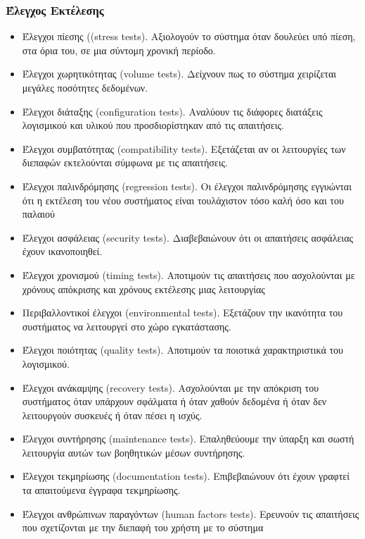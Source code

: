 \documentclass[a4paper, 11pt]{article}
\begin{document}
{{\subsubsection{Έλεγχος Εκτέλεσης}
\begin{itemize}
\item Έλεγχοι πίεσης (\textlatin{(stress tests)}. Aξιολογούν το σύστημα όταν δουλεύει υπό πίεση, στα όρια του, σε μια σύντομη χρονική περίοδο.
\item Έλεγχοι χωρητικότητας \textlatin{(volume tests)}.  Δείχνουν πως το σύστημα χειρίζεται μεγάλες ποσότητες δεδομένων.
\item Έλεγχοι διάταξης \textlatin{(configuration tests)}. Αναλύουν τις διάφορες διατάξεις λογισμικού και υλικού που προσδιορίστηκαν από τις απαιτήσεις.
\item Έλεγχοι συμβατότητας \textlatin{(compatibility tests)}. Εξετάζεται αν οι λειτουργίες των διεπαφών εκτελούνται σύμφωνα με τις απαιτήσεις. 
\item Έλεγχοι παλινδρόμησης \textlatin{(regression tests)}. Οι έλεγχοι παλινδρόμησης εγγυώνται ότι η εκτέλεση του νέου συστήματος είναι τουλάχιστον τόσο καλή όσο και του παλαιού
\item Έλεγχοι ασφάλειας \textlatin{(security tests)}.  Διαβεβαιώνουν ότι οι απαιτήσεις ασφάλειας έχουν ικανοποιηθεί.
\item Έλεγχοι χρονισμού \textlatin{(timing tests)}.  Αποτιμούν τις απαιτήσεις που ασχολούνται με χρόνους απόκρισης και χρόνους εκτέλεσης μιας λειτουργίας
\item Περιβαλλοντικοί έλεγχοι \textlatin{(environmental tests)}. Εξετάζουν την ικανότητα του συστήματος να λειτουργεί στο χώρο εγκατάστασης. 
\item Έλεγχοι ποιότητας \textlatin{(quality tests)}. Αποτιμούν τα ποιοτικά χαρακτηριστικά του λογισμικού.
\item Έλεγχοι ανάκαμψης \textlatin{(recovery tests)}. Ασχολούνται με την απόκριση του συστήματος όταν υπάρχουν σφάλματα ή όταν χαθούν δεδομένα ή όταν δεν λειτουργούν συσκευές ή όταν πέσει η ισχύς. 
\item Έλεγχοι συντήρησης \textlatin{(maintenance tests)}. Επαληθεύουμε την ύπαρξη και σωστή λειτουργία αυτών των βοηθητικών μέσων συντήρησης.
\item Έλεγχοι τεκμηρίωσης \textlatin{(documentation tests)}. Επιβεβαιώνουν ότι έχουν γραφτεί τα απαιτούμενα έγγραφα τεκμηρίωσης.
\item Έλεγχοι ανθρώπινων παραγόντων \textlatin{(human factors tests)}. Ερευνούν τις απαιτήσεις που σχετίζονται με την διεπαφή του χρήστη με το σύστημα
\end{itemize}

}}
\end{document}
